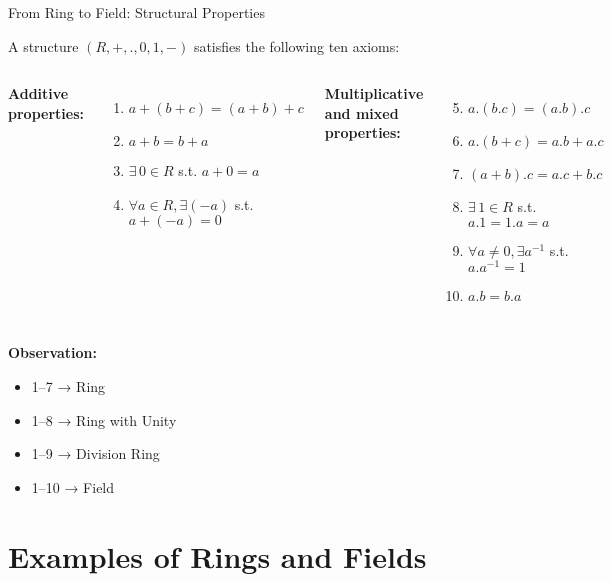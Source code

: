 \begin{frame}{From Ring to Field: Structural Properties}
\vspace{-0.5cm}
\begin{block}{}
    A structure $(R,+,.,0,1,-)$ satisfies the following ten axioms:

\begin{columns}[t]
\textbf{Additive properties:}
\begin{enumerate}
\item $a+(b+c)=(a+b)+c$
\item $a+b=b+a$
\item $\exists\,0\in R$ s.t. $a+0=a$
\item $\forall a\in R, \exists (-a)$ s.t. $a+(-a)=0$
\end{enumerate}

\textbf{Multiplicative and mixed properties:}
\begin{enumerate}
\setcounter{enumi}{4}
\item $a.(b.c)=(a.b).c$
\item $a.(b+c)=a.b+a.c$
\item $(a+b).c=a.c+b.c$
\item $\exists\,1\in R$ s.t. $a.1=1.a=a$
\item $\forall a\neq0, \exists a^{-1}$ s.t. $a.a^{-1}=1$
\item $a.b=b.a$
\end{enumerate}
\end{columns}
\vspace{-0.7cm}
\textbf{Observation:}
\begin{itemize}
  \item 1–7 → Ring
  \item 1–8 → Ring with Unity
  \item 1–9 → Division Ring
  \item 1–10 → Field
\end{itemize}
\end{block}
\end{frame}

\section{Examples of Rings and Fields}

